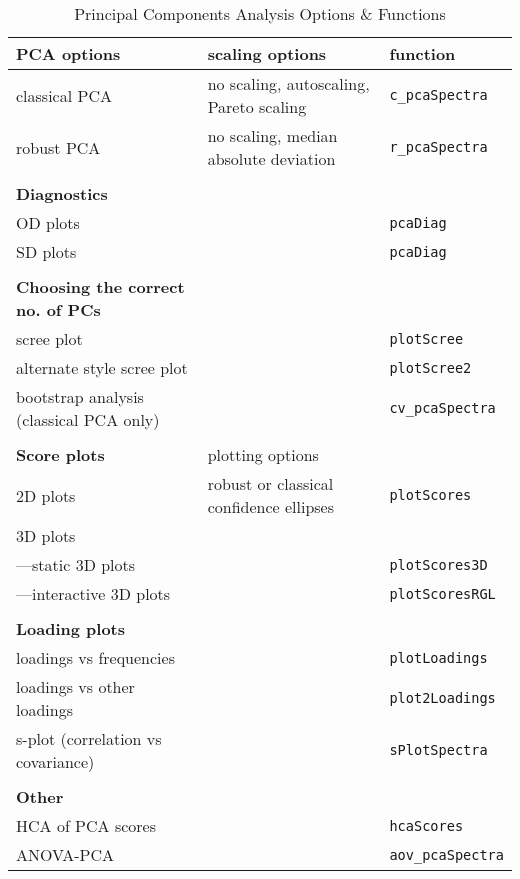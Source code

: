 \documentclass[letter,10pt,twocolumn,twoside,printwatermark=false]{pinp}
\begin{document}
\begin{table*}
\caption{Principal Components Analysis Options \& Functions}
\label{opt}
\begin{center}
\begin{tabular}{|ll|l|}
\hline
\textbf{PCA options} & scaling options & function\\
\hline
classical PCA &  no scaling, autoscaling, Pareto scaling & \texttt{c\_pcaSpectra} \\
robust PCA & no scaling, median absolute deviation & \texttt{r\_pcaSpectra} \\
&&\\
\textbf{Diagnostics} &  & \\
\hline
OD plots & & \texttt{pcaDiag} \\
SD plots & & \texttt{pcaDiag}\\
&&\\
\textbf{Choosing the correct no. of PCs} & & \\
\hline
scree plot & & \texttt{plotScree}\\
alternate style scree plot & & \texttt{plotScree2}\\
bootstrap analysis (classical PCA only) & & \texttt{cv\_pcaSpectra} \\
&&\\

\textbf{Score plots} & plotting options &  \\
\hline
2D plots & robust or classical confidence ellipses & \texttt{plotScores} \\
3D plots && \\
---static 3D plots & & \texttt{plotScores3D}\\
---interactive 3D plots & & \texttt{plotScoresRGL}\\
&&\\
\textbf{Loading plots} & & \\
\hline
loadings vs frequencies & & \texttt{plotLoadings} \\
loadings vs other loadings & & \texttt{plot2Loadings} \\
s-plot (correlation vs covariance) & & \texttt{sPlotSpectra} \\
&&\\
\hline
\textbf{Other} &&\\
HCA of PCA scores & & \texttt{hcaScores} \\
ANOVA-PCA & & \texttt{aov\_pcaSpectra} \\
\hline
\end{tabular}
\end{center}
\end{table*}
\end{document}
